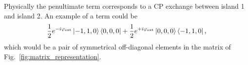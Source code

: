 \documentclass[%
superscriptaddress,
preprint,
preprintnumbers,
bibnotes,
amsmath,
amssymb,
aps,
showkeys,
prb,
]{revtex4-1}
\newcommand{\blue}[1]{\textcolor{blue}{#1}}
\newcommand{\iketbra}[2]{\ket{#1}\bra{#2}}
\begin{document}
%


Physically the penultimate term corresponds  to a CP exchange between island 1 and  island 2. An example
  of a term could be
  \begin{equation}
    \label{eq:ab6}
    \frac{1}{2}e^{-i\varphi_{\text{ext}}}\iketbra{-1,1,0}{0,0,0} + \frac{1}{2}e^{+i\varphi_{\text{ext}}}\iketbra{0,0,0}{-1,1,0},
  \end{equation}
  \noindent  which would  be a  pair of  symmetrical off-diagonal  elements in  the matrix  of
  Fig.~\ref{fig:matrix_representation}.
\end{document}
